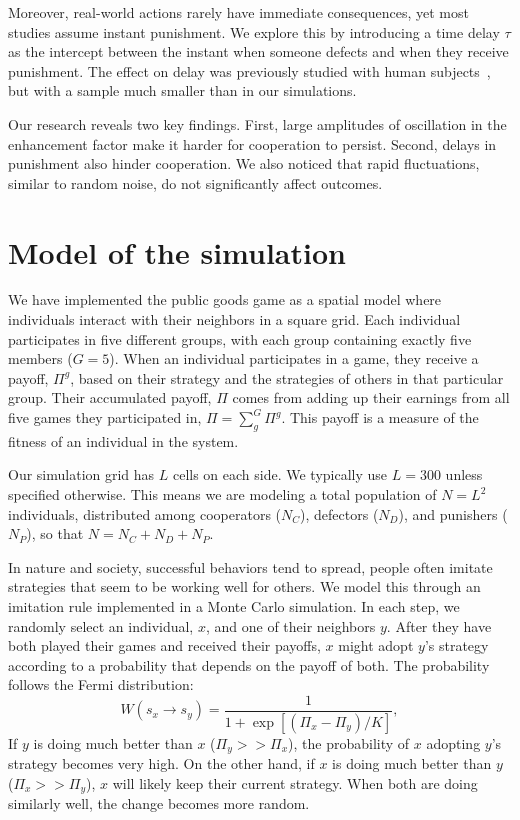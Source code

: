 Moreover, real-world actions rarely have immediate consequences, yet most studies assume instant punishment. We explore this by introducing a time delay $\tau$ as the intercept between the instant when someone defects and when they receive punishment. The effect on delay was previously studied with human subjects~\cite{Late}, but with a sample much smaller than in our simulations.

Our research reveals two key findings. First, large amplitudes of oscillation in the enhancement factor make it harder for cooperation to persist. Second, delays in punishment also hinder cooperation. We also noticed that rapid fluctuations, similar to random noise, do not significantly affect outcomes.



\section{Model of the simulation}
\label{3model}




We have implemented the public goods game as a spatial model where individuals interact with their neighbors in a square grid. Each individual participates in five different groups, with each group containing exactly five members ($G=5$). When an individual participates in a game, they receive a payoff, $\Pi^g$, based on their strategy and the strategies of others in that particular group. Their accumulated payoff, $\Pi$ comes from adding up their earnings from all five games they participated in, $\Pi=\sum_g^G \Pi^g$. This payoff is a measure of the fitness of an individual in the system.

Our simulation grid has $L$ cells on each side. We typically use $L=300$ unless specified otherwise. This means we are modeling a total population of $N=L^2$ individuals, distributed among cooperators ($N_C$), defectors ($N_D$), and punishers ($N_P$), so that $N=N_C+N_D+N_P$.

In nature and society, successful behaviors tend to spread, people often imitate strategies that seem to be working well for others. We model this through an imitation rule implemented in a Monte Carlo simulation. In each step, we randomly select an individual, $x$, and one of their neighbors $y$. After they have both played their games and received their payoffs, $x$ might adopt $y$'s strategy according to a probability that depends on the payoff of both. The probability follows the Fermi distribution:
\begin{equation}
W(s_x \rightarrow s_y)=\frac{1}{1+\exp[(\Pi_{x}-\Pi_{y})/K]},
\end{equation}
If $y$ is doing much better than $x$ ($\Pi_y >> \Pi_x$), the probability of $x$ adopting $y$'s strategy becomes very high. On the other hand, if $x$ is doing much better than $y$ ($\Pi_x >> \Pi_y$), $x$ will likely keep their current strategy. When both are doing similarly well, the change becomes more random.

